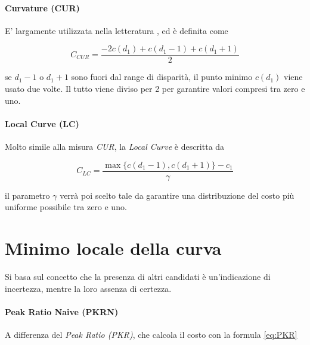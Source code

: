 \documentclass[12pt]{report}
\begin{document}
			\paragraph{Curvature (CUR)}
			\label{par:curvature}
			
				E' largamente utilizzata nella letteratura \cite{indoors_outdoors}, ed è definita come
				
				\begin{equation}
					C_{CUR}=\frac{-2c(d_{1})+c(d_{1}-1)+c(d_{1}+1)}{2}
					\label{eq:CUR}
				\end{equation} 
			
				\noindent se $d_{1}-1$ o $d_{1}+1$ sono fuori dal range di disparità, il punto minimo $c(d_{1})$ viene usato due volte. Il tutto viene diviso per 2 per garantire valori compresi tra zero e uno.
			
			
			\paragraph{Local Curve (LC)} 
			\label{par:local}
			
				Molto simile alla misura \textit{CUR}, la \textit{Local Curve} è descritta da
				
				\begin{equation}
					C_{LC}=\frac {\max\bigr\{ c(d_{1}-1) ,c(d_{1}+1) \bigr\} - c_{1}} {\gamma}
					\label{eq:LC}
				\end{equation}
				
				\noindent il parametro $\gamma$ verrà poi scelto tale da garantire una distribuzione del costo più uniforme possibile tra zero e uno.
			
			
			
		\section{Minimo locale della curva}
		\label{sec:localMinima}	
		
			Si basa sul concetto che la presenza di altri candidati è un'indicazione di incertezza, mentre la loro assenza di certezza.
			
			\paragraph{Peak Ratio Naive (PKRN)} 
			\label{par:PKRN}
		
				A differenza del \textit{Peak Ratio (PKR)}, che calcola il costo con la formula \ref{eq:PKR}
		
\end{document}
